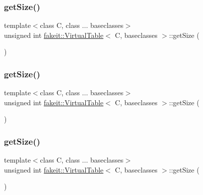 \subsubsection{\texorpdfstring{getSize()}{getSize()}\hspace{0.1cm}{\footnotesize\ttfamily [6/10]}}
{\footnotesize\ttfamily template$<$class C, class ... baseclasses$>$ \\
unsigned int \mbox{\hyperlink{structfakeit_1_1VirtualTable}{fakeit\+::\+Virtual\+Table}}$<$ C, baseclasses $>$\+::get\+Size (\begin{DoxyParamCaption}{ }\end{DoxyParamCaption})\hspace{0.3cm}{\ttfamily [inline]}}

\mbox{\label{structfakeit_1_1VirtualTable_a014d48c976f89207564bf8d68b64a039}} 
\subsubsection{\texorpdfstring{getSize()}{getSize()}\hspace{0.1cm}{\footnotesize\ttfamily [7/10]}}
{\footnotesize\ttfamily template$<$class C, class ... baseclasses$>$ \\
unsigned int \mbox{\hyperlink{structfakeit_1_1VirtualTable}{fakeit\+::\+Virtual\+Table}}$<$ C, baseclasses $>$\+::get\+Size (\begin{DoxyParamCaption}{ }\end{DoxyParamCaption})\hspace{0.3cm}{\ttfamily [inline]}}

\mbox{\label{structfakeit_1_1VirtualTable_a014d48c976f89207564bf8d68b64a039}} 
\subsubsection{\texorpdfstring{getSize()}{getSize()}\hspace{0.1cm}{\footnotesize\ttfamily [8/10]}}
{\footnotesize\ttfamily template$<$class C, class ... baseclasses$>$ \\
unsigned int \mbox{\hyperlink{structfakeit_1_1VirtualTable}{fakeit\+::\+Virtual\+Table}}$<$ C, baseclasses $>$\+::get\+Size (\begin{DoxyParamCaption}{ }\end{DoxyParamCaption})\hspace{0.3cm}{\ttfamily [inline]}}

